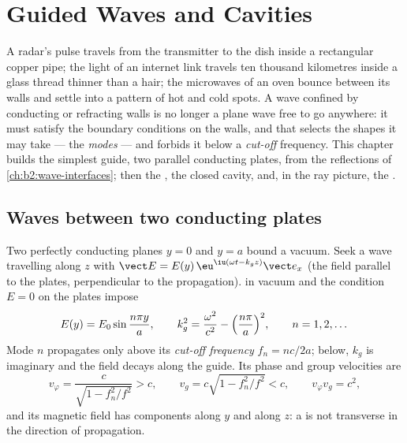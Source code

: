 \chapter{Guided Waves and Cavities}\label{ch:b2:guided-waves}

A radar's pulse travels from the transmitter to the dish inside a
rectangular copper pipe; the light of an internet link travels ten
thousand kilometres inside a glass thread thinner than a hair; the
microwaves of an oven bounce between its walls and settle into a
pattern of hot and cold spots. A wave confined by conducting or
refracting walls is no longer a plane wave free to go anywhere: it
must satisfy the boundary conditions on the walls, and that selects
the shapes it may take --- the \emph{modes} --- and forbids it below a
\emph{cut-off} frequency. This chapter builds the simplest guide, two
parallel conducting plates, from the reflections of
\cref{ch:b2:wave-interfaces}; then the , the
closed cavity, and, in the ray picture, the .

\section{Waves between two conducting plates}

\begin{proposition}\label{prop:b2:guided-waves:plates}
Two perfectly conducting planes $y = 0$ and $y = a$ bound a vacuum.
Seek a wave travelling along $z$ with $\vect E = E(y)\,\eu^{\iu(\omega t - k_gz)}
\vect e_x$ (the field parallel to the plates, perpendicular to the
propagation).  in vacuum and the condition $E = 0$
on the plates impose
\[
E(y) = E_0\sin\frac{n\pi y}a , \qquad
k_g^2 = \frac{\omega^2}{c^2} - \Bigl(\frac{n\pi}a\Bigr)^2 , \qquad n = 1, 2, \dots
\]
Mode $n$ propagates only above its \emph{cut-off frequency} $f_n = nc/2a$;
below, $k_g$ is imaginary and the field decays along the guide. Its
phase and group velocities are
\[
v_\varphi = \frac c{\sqrt{1 - f_n^2/f^2}} > c , \qquad
v_g = c\sqrt{1 - f_n^2/f^2} < c , \qquad v_\varphi v_g = c^2 ,
\]
and its magnetic field has components along $y$ and along $z$: a
 is not transverse in the direction of propagation.
\end{proposition}

